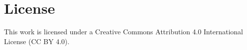 \documentclass{article}
\begin{document}

\ConsciousnessDisclaimer

\section*{License}
This work is licensed under a Creative Commons Attribution 4.0 International License (CC BY 4.0).
\end{document}
